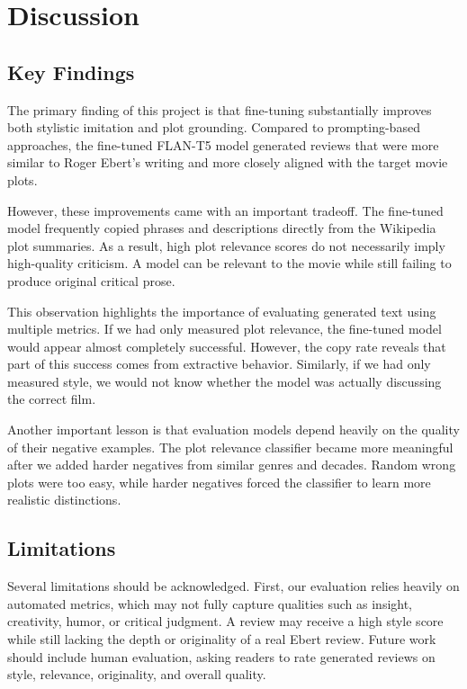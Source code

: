\section{Discussion}

\subsection{Key Findings}

The primary finding of this project is that fine-tuning substantially improves both stylistic imitation and plot grounding. Compared to prompting-based approaches, the fine-tuned FLAN-T5 model generated reviews that were more similar to Roger Ebert's writing and more closely aligned with the target movie plots.

However, these improvements came with an important tradeoff. The fine-tuned model frequently copied phrases and descriptions directly from the Wikipedia plot summaries. As a result, high plot relevance scores do not necessarily imply high-quality criticism. A model can be relevant to the movie while still failing to produce original critical prose.

This observation highlights the importance of evaluating generated text using multiple metrics. If we had only measured plot relevance, the fine-tuned model would appear almost completely successful. However, the copy rate reveals that part of this success comes from extractive behavior. Similarly, if we had only measured style, we would not know whether the model was actually discussing the correct film.

Another important lesson is that evaluation models depend heavily on the quality of their negative examples. The plot relevance classifier became more meaningful after we added harder negatives from similar genres and decades. Random wrong plots were too easy, while harder negatives forced the classifier to learn more realistic distinctions.

\subsection{Limitations}

Several limitations should be acknowledged. First, our evaluation relies heavily on automated metrics, which may not fully capture qualities such as insight, creativity, humor, or critical judgment. A review may receive a high style score while still lacking the depth or originality of a real Ebert review. Future work should include human evaluation, asking readers to rate generated reviews on style, relevance, originality, and overall quality.

